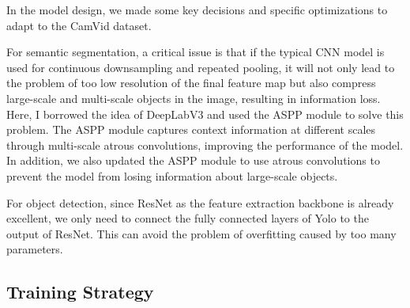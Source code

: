 \documentclass[conference]{IEEEtran}
\begin{document}


In the model design, we made some key decisions and specific optimizations to adapt to the CamVid dataset.

For semantic segmentation, a critical issue is that if the typical CNN model is used for continuous downsampling and repeated pooling, it will not only lead to the problem of too low resolution of the final feature map but also compress large-scale and multi-scale objects in the image, resulting in information loss. Here, I borrowed the idea of DeepLabV3 and used the ASPP module to solve this problem. The ASPP module captures context information at different scales through multi-scale atrous convolutions, improving the performance of the model. In addition, we also updated the ASPP module to use atrous convolutions to prevent the model from losing information about large-scale objects.

For object detection, since ResNet as the feature extraction backbone is already excellent, we only need to connect the fully connected layers of Yolo to the output of ResNet. This can avoid the problem of overfitting caused by too many parameters.


\subsection{Training Strategy}

\end{document}
